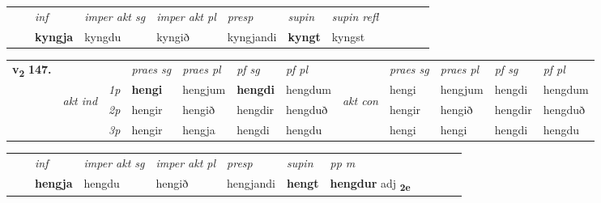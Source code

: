 \begin{tabular}{llllllllllll}
 & & \textit{inf} & \textit{imper akt sg} & \textit{imper akt pl}   & \textit{presp} & \textit{supin} & \textit{supin refl}      \\*
  & & \textbf{kyngja} & kyngdu  & kyngið   & kyngjandi &  \textbf{kyngt} & kyngst  \\*
\cmidrule{1-12}
\end{tabular}



\begin{tabular}{llllllllllll} \toprule
\multirow{4}{*}{{{\textbf{v{\textsubscript{2}}} \Large{\textbf{147.}}}}}  & &   &  \textit{praes sg}  & \textit{praes pl}  &\textit{ pf sg} & \textit{pf pl} &  &  \textit{praes sg}  & \textit{praes pl}  & \textit{pf sg} & \textit{pf pl } \\*
	\cmidrule{4-7} \cmidrule{9-12}
 & \multirow{3}{*}{\begin{turn}{90}\textit{akt ind}\end{turn}} & {\textit{1p}} & \textbf{hengi} & hengjum    & \textbf{hengdi} & hengdum & \multirow{3}{*}{\begin{turn}{90}\textit{akt con}\end{turn}} &hengi & hengjum & hengdi & hengdum\\*
& &  {\textit{2p}} &  hengir  & hengið   & hengdir & hengduð & & hengir & hengið & hengdir & hengduð \\*
& &  {\textit{3p}} & hengir & hengja   & hengdi & hengdu & & hengi & hengi& hengdi & hengdu  \\*
\cmidrule{4-7} \cmidrule{9-12}
\end{tabular}


\begin{tabular}{llllllllllll}
 & & \textit{inf} & \textit{imper akt sg} & \textit{imper akt pl}   & \textit{presp} & \textit{supin}  & \textit{pp m}     \\*
  & & \textbf{hengja} & hengdu  & hengið   & hengjandi &  \textbf{hengt}  & \textbf{hengdur} adj \textbf{\textsubscript{2e}} \\*
\cmidrule{1-12}
\end{tabular}



